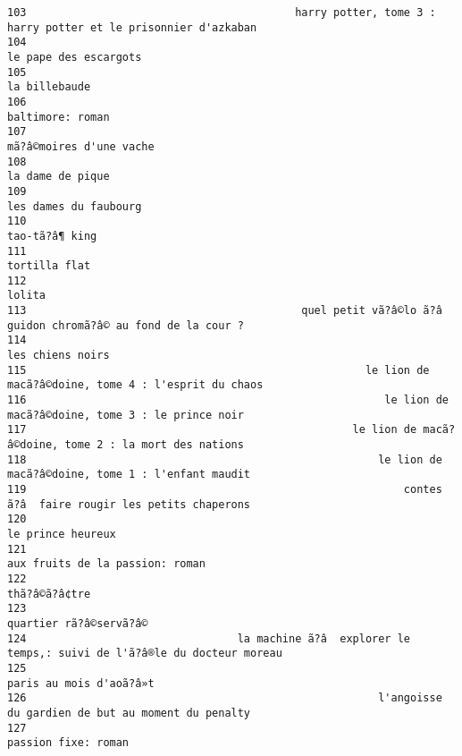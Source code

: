 \documentclass[
]{report}
\begin{document}
\begin{verbatim}
103                                          harry potter, tome 3 : harry potter et le prisonnier d'azkaban
104                                                                                   le pape des escargots
105                                                                                           la billebaude
106                                                                                        baltimore: roman
107                                                                                 mã?â©moires d'une vache
108                                                                                        la dame de pique
109                                                                                   les dames du faubourg
110                                                                                          tao-tã?â¶ king
111                                                                                           tortilla flat
112                                                                                                  lolita
113                                           quel petit vã?â©lo ã?â  guidon chromã?â© au fond de la cour ?
114                                                                                        les chiens noirs
115                                                     le lion de macã?â©doine, tome 4 : l'esprit du chaos
116                                                        le lion de macã?â©doine, tome 3 : le prince noir
117                                                   le lion de macã?â©doine, tome 2 : la mort des nations
118                                                       le lion de macã?â©doine, tome 1 : l'enfant maudit
119                                                           contes ã?â  faire rougir les petits chaperons
120                                                                                       le prince heureux
121                                                                         aux fruits de la passion: roman
122                                                                                           thã?â©ã?â¢tre
123                                                                                  quartier rã?â©servã?â©
124                                 la machine ã?â  explorer le temps,: suivi de l'ã?â®le du docteur moreau
125                                                                                 paris au mois d'aoã?â»t
126                                                       l'angoisse du gardien de but au moment du penalty
127                                                                                     passion fixe: roman

\end{verbatim}
\end{document}
